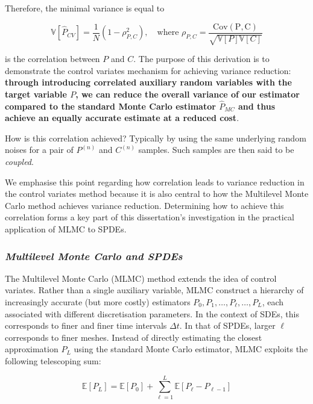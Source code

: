 Therefore, the minimal variance is equal to

\begin{equation*}
    \mathbb{V}[\hat{P}_{CV}] = \frac{1}{N} \left(1 - \rho_{P,C}^2\right), 
    \quad \text{where } \rho_{P,C} = \frac{\mathrm{Cov(P,C)}}{\sqrt{\mathbb{V}[P]\mathbb{V}[C]}}
\end{equation*}


is the correlation between $P$ and $C$. The purpose of this derivation is to
demonstrate the control variates mechanism for achieving variance reduction:
\textbf{through introducing correlated auxiliary random variables 
with the target variable $P$, we can reduce the overall variance of our estimator
compared to the standard Monte Carlo estimator $\hat{P}_{MC}$ and thus achieve an 
equally accurate estimate at a reduced cost}.

How is this correlation achieved? Typically by using the same underlying 
random noises for a pair of $P^{(n)}$ and $C^{(n)}$ samples. Such 
samples are then said to be \textit{coupled}.

We emphasise this point regarding how correlation leads to variance 
reduction in the control variates method because it is also central to how the 
Multilevel Monte Carlo method achieves variance reduction. Determining how to 
achieve this correlation forms a key part of this dissertation's investigation
in the practical application of MLMC to SPDEs.


\subsubsection*{\textit{Multilevel Monte Carlo and SPDEs}}

The Multilevel Monte Carlo (MLMC) method extends the 
idea of control variates. Rather than a single 
auxiliary variable, MLMC construct a hierarchy of increasingly accurate 
(but more costly) estimators $P_0, P_1, \dots, P_\ell, \dots, P_L$, each 
associated with different discretisation parameters. In the context of SDEs, this 
corresponds to finer and finer time intervals $\Delta t$. In that of SPDEs, 
larger $\ell$ corresponds to finer meshes. Instead of directly estimating the closest 
approximation $P_L$ using the standard Monte Carlo estimator, MLMC exploits
the following telescoping sum:

\begin{equation}\label{eq:mlmc_telescope}
    \mathbb{E}[P_L] = \mathbb{E}[P_0] + \sum_{\ell =1}^L \mathbb{E}[P_\ell - P_{\ell -1}]
\end{equation}

